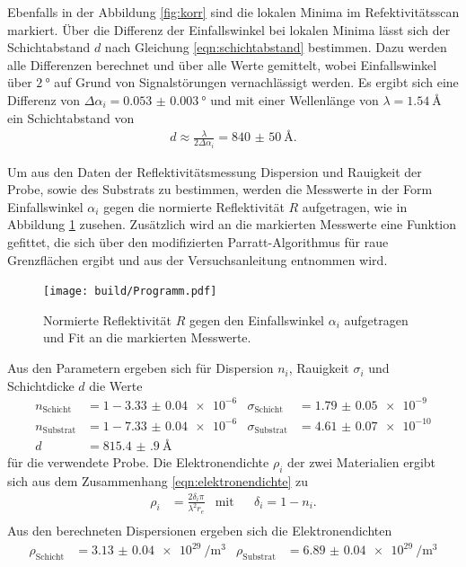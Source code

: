 Ebenfalls in der Abbildung \ref{fig:korr}
sind die lokalen Minima im Refektivitätsscan markiert.
Über die Differenz der Einfallswinkel bei lokalen Minima lässt
sich der Schichtabstand $d$ nach Gleichung \eqref{eqn:schichtabstand}
bestimmen.
Dazu werden alle Differenzen
berechnet und über alle Werte gemittelt, wobei Einfallswinkel
über $\SI{2}{\degree}$ auf Grund von Signalstörungen vernachlässigt werden.
Es ergibt sich eine Differenz von $\Delta \alpha_i = \SI{0.053(3)}{\degree}$
und mit einer Wellenlänge von $\lambda=\SI{1.54}{\angstrom}$
ein Schichtabstand von
\begin{align}
d \approx \frac{\lambda}{2\Delta\alpha_i} = \SI{840(50)}{\angstrom}.
\end{align}

Um aus den Daten der Reflektivitätsmessung Dispersion und Rauigkeit
der Probe, sowie des Substrats zu bestimmen, werden die Messwerte in der Form
Einfallswinkel $\alpha_i$ gegen die
normierte Reflektivität $R$ aufgetragen, wie in Abbildung \ref{fig:messung}
zusehen. Zusätzlich wird an die markierten Messwerte
eine Funktion gefittet, die
sich über den
modifizierten Parratt-Algorithmus für raue Grenzflächen ergibt und
aus der Versuchsanleitung \cite{sample} entnommen wird.




\begin{figure}
 \centering
   \texttt{[image: build/Programm.pdf]}
   \caption{Normierte Reflektivität $R$ gegen den Einfallswinkel $\alpha_i$ aufgetragen und Fit an die markierten Messwerte.}
   \label{fig:messung}
\end{figure}

Aus den Parametern ergeben sich für Dispersion $n_i$, Rauigkeit $\sigma_i$ und Schichtdicke $d$ die Werte
\begin{align}
  n_{\mathrm{Schicht}}&= 1-\num{3.33(4)e-6}  & \sigma_{\mathrm{Schicht}}&= \num{1.79(5)e-9} \\
  n_{\mathrm{Substrat}}&=1-\num{7.33(4)e-6} & \sigma_{\mathrm{Substrat}}&= \num{4.61(7)e-10}\\ %
  d& =\SI{815.4(9)}{\angstrom}
\end{align}
für die verwendete Probe.
Die Elektronendichte $\rho_i$ der zwei Materialien ergibt sich aus dem Zusammenhang \eqref{eqn:elektronendichte} zu
\begin{align}
\rho_i&=\frac{2\delta_i \pi}{\lambda^2 r_e} &\text{mit}&  &\delta_i = 1 - n_i.\\
\end{align}
Aus den berechneten Dispersionen ergeben sich die Elektronendichten
\begin{align}
\rho_{\mathrm{Schicht}}&=\SI{3.13(4)e29}{\per\cubic\meter}  & \rho_{\mathrm{Substrat}}&=\SI{6.89(4)e29}{\per\cubic\meter}
\end{align}
